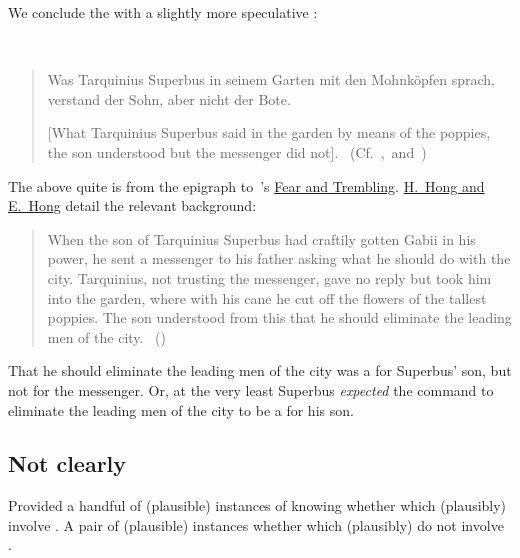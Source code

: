 \begin{note}[Poppies]
  We conclude the  with a slightly more speculative :
  \begin{illustration}[Poppies]
    \mbox{ }
    \vspace{-\baselineskip}
    \begin{quote}
      Was Tarquinius Superbus in seinem Garten mit den Mohnköpfen sprach, verstand der Sohn, aber nicht der Bote.

      [What Tarquinius Superbus said in the garden by means of the poppies, the son understood but the messenger did not].\newline
    \mbox{ }\hfill\mbox{(Cf.~\cite[3]{Kierkegaard:1983ta}, and~\cite[190]{Hamann:1822vp})}
  \end{quote}
  \vspace{-\baselineskip}
  \end{illustration}
  The above quite is from the epigraph to~\citeauthor{Kierkegaard:1983ta}'s \hyperlink{cite.Kierkegaard:1983ta}{Fear and Trembling}.
  \hyperlink{cite.Kierkegaard:1983ta}{H.\ Hong and E.\ Hong} detail the relevant background:

  \begin{quote}
    When the son of Tarquinius Superbus had craftily gotten Gabii in his power, he sent a messenger to his father asking what he should do with the city.
    Tarquinius, not trusting the messenger, gave no reply but took him into the garden, where with his cane he cut off the flowers of the tallest poppies.
    The son understood from this that he should eliminate the leading men of the city.%
    \mbox{ }\hfill\mbox{(\citeyear[339]{Kierkegaard:1983ta})}
  \end{quote}
  That he should eliminate the leading men of the city was a  for Superbus' son, but not for the messenger.
  Or, at the very least Superbus \emph{expected} the command to eliminate the leading men of the city to be a \fc{} for his son.
\end{note}

\subsection{Not clearly }
\label{cha:fcs:sec:illu:no}

\begin{note}
  Provided a handful of (plausible) instances of knowing whether which (plausibly) involve .
  A pair of (plausible) instances whether which (plausibly) do not involve .
\end{note}

